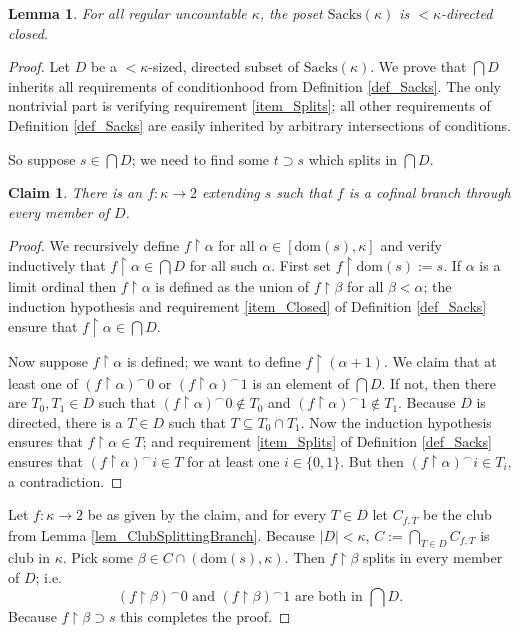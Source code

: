 \documentclass{amsart}
\newtheorem{lemma}[theorem]{Lemma}
\newtheorem{nonGlobalClaim}{Claim}[theorem]  %
\begin{document}
\begin{lemma}\label{lem_SacksDirectedClosed}
For all regular uncountable $\kappa$, the poset $\text{Sacks}(\kappa)$ is $<\kappa$-directed closed.
\end{lemma}
\begin{proof}
Let $D$ be a $<\kappa$-sized, directed subset of $\text{Sacks}(\kappa)$.  We prove that $\bigcap D$ inherits all requirements of conditionhood from Definition \ref{def_Sacks}.  The only nontrivial part is verifying requirement \ref{item_Splits}; all other requirements of Definition \ref{def_Sacks} are easily inherited by arbitrary intersections of conditions.

So suppose $s \in \bigcap D$; we need to find some $t \supset s$ which splits in $\bigcap D$.  
\begin{nonGlobalClaim}
There is an $f: \kappa \to 2$ extending $s$ such that $f$ is a cofinal branch through every member of $D$.
\end{nonGlobalClaim}  
\begin{proof}
We recursively define $f \restriction \alpha$ for all $\alpha \in [\text{dom}(s), \kappa]$ and verify inductively that $f \restriction \alpha \in \bigcap D$ for all such $\alpha$.  First set $f \restriction \text{dom}(s):= s$.  If $\alpha$ is a limit ordinal then $f \restriction \alpha$ is defined as the union of $f \restriction \beta$ for all $\beta < \alpha$; the induction hypothesis and requirement \ref{item_Closed} of Definition \ref{def_Sacks} ensure that $f \restriction \alpha \in \bigcap D$.  

Now suppose $f \restriction \alpha$ is defined; we want to define $f \restriction (\alpha + 1)$.  We claim that at least one of $(f \restriction \alpha)^\frown 0$ or $(f \restriction \alpha)^\frown 1$ is an element of $\bigcap D$.  If not, then there are $T_0, T_1 \in D$ such that $(f \restriction \alpha)^\frown 0 \notin T_0$ and $(f \restriction \alpha)^\frown 1 \notin T_1$.  Because $D$ is directed, there is a $T \in D$ such that $T \subseteq T_0 \cap T_1$.  Now the induction hypothesis ensures that $f \restriction \alpha \in T$; and requirement \ref{item_Splits} of Definition \ref{def_Sacks} ensures that $(f \restriction \alpha)^\frown i \in T$ for at least one $i \in \{ 0,1 \}$.  But then $(f \restriction \alpha)^\frown i \in T_i$, a contradiction.
\end{proof}

Let $f: \kappa \to 2$ be as given by the claim, and for every $T \in D$ let $C_{f,T}$ be the club from Lemma \ref{lem_ClubSplittingBranch}.  Because $|D|<\kappa$, $C:= \bigcap_{T \in D} C_{f,T}$ is club in $\kappa$.  Pick some $\beta \in C \cap (\text{dom}(s),\kappa)$.  Then $f \restriction \beta$ splits in every member of $D$; i.e.
\[
(f \restriction \beta)^\frown 0 \text{ and } (f \restriction \beta)^\frown 1 \text{ are both in } \bigcap D.
\]
Because $f \restriction \beta \supset s$ this completes the proof.
\end{proof}
\end{document}
